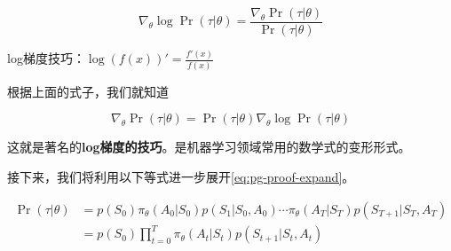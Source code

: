 \documentclass[lang=cn,newtx,10pt,scheme=chinese]{elegantbook}
\begin{document}
\begin{equation}
\nabla_\theta\log\Pr(\tau|\theta)=\frac{\nabla_\theta\Pr(\tau|\theta)}{\Pr(\tau|\theta)}
\end{equation}

\begin{marker}
log梯度技巧：$\log(f(x))'=\frac{f'(x)}{f(x)}$
\end{marker}

根据上面的式子，我们就知道

\begin{equation}
\nabla_\theta\Pr(\tau|\theta)=\Pr(\tau|\theta)\nabla_\theta\log\Pr(\tau|\theta)
\end{equation}

这就是著名的\textbf{log梯度的技巧}。是机器学习领域常用的数学式的变形形式。

接下来，我们将利用以下等式进一步展开\ref{eq:pg-proof-expand}。

\begin{equation}
\begin{aligned}
\Pr(\tau|\theta) &= p(S_0)\pi_\theta(A_0|S_0)p(S_1|S_0,A_0)\cdots\pi_\theta(A_T|S_T)p(S_{T+1}|S_T,A_T) \\
&= p(S_0)\prod_{t=0}^T\pi_\theta(A_t|S_t)p(S_{t+1}|S_t,A_t)
\end{aligned}
\end{equation}
\end{document}
